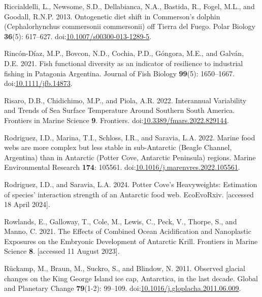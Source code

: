 \documentclass[
]{article}
\newlength{\cslhangindent}
\newenvironment{CSLReferences}[2] %
 {\begin{list}{}{%
  \setlength{\itemindent}{0pt}
  \setlength{\leftmargin}{0pt}
  \setlength{\parsep}{0pt}
  \ifodd #1
   \setlength{\leftmargin}{\cslhangindent}
   \setlength{\itemindent}{-1\cslhangindent}
  \fi
  \setlength{\itemsep}{#2\baselineskip}}}
 {\end{list}}
\begin{document}
\begin{CSLReferences}{1}{0}
Riccialdelli, L., Newsome, S.D., Dellabianca, N.A., Bastida, R., Fogel,
M.L., and Goodall, R.N.P. 2013. Ontogenetic diet shift in {Commerson}'s
dolphin ({Cephalorhynchus} commersonii commersonii) off {Tierra} del
{Fuego}. Polar Biology \textbf{36}(5): 617--627.
doi:\href{https://doi.org/10.1007/s00300-013-1289-5}{10.1007/s00300-013-1289-5}.

Rincón-Díaz, M.P., Bovcon, N.D., Cochia, P.D., Góngora, M.E., and
Galván, D.E. 2021. Fish functional diversity as an indicator of
resilience to industrial fishing in {Patagonia Argentina}. Journal of
Fish Biology \textbf{99}(5): 1650--1667.
doi:\href{https://doi.org/10.1111/jfb.14873}{10.1111/jfb.14873}.

Risaro, D.B., Chidichimo, M.P., and Piola, A.R. 2022. Interannual
{Variability} and {Trends} of {Sea Surface Temperature Around Southern
South America}. Frontiers in Marine Science \textbf{9}. Frontiers.
doi:\href{https://doi.org/10.3389/fmars.2022.829144}{10.3389/fmars.2022.829144}.

Rodriguez, I.D., Marina, T.I., Schloss, I.R., and Saravia, L.A. 2022.
Marine food webs are more complex but less stable in sub-{Antarctic}
({Beagle Channel}, {Argentina}) than in {Antarctic} ({Potter Cove},
{Antarctic Peninsula}) regions. Marine Environmental Research
\textbf{174}: 105561.
doi:\href{https://doi.org/10.1016/j.marenvres.2022.105561}{10.1016/j.marenvres.2022.105561}.

Rodriguez, I.D., and Saravia, L.A. 2024. Potter {Cove}'s {Heavyweights}:
{Estimation} of species' interaction strength of an {Antarctic} food
web. EcoEvoRxiv. {[}accessed 18 April 2024{]}.

Rowlands, E., Galloway, T., Cole, M., Lewis, C., Peck, V., Thorpe, S.,
and Manno, C. 2021. The {Effects} of {Combined Ocean Acidification} and
{Nanoplastic Exposures} on the {Embryonic Development} of {Antarctic
Krill}. Frontiers in Marine Science \textbf{8}. {[}accessed 11 August
2023{]}.

Rückamp, M., Braun, M., Suckro, S., and Blindow, N. 2011. Observed
glacial changes on the {King George Island} ice cap, {Antarctica}, in
the last decade. Global and Planetary Change \textbf{79}(1-2): 99--109.
doi:\href{https://doi.org/10.1016/j.gloplacha.2011.06.009}{10.1016/j.gloplacha.2011.06.009}.


\end{CSLReferences}
\end{document}
